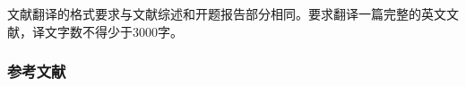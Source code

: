 \part{} %
\label{prt:文献翻译_}
	\setcounter{section}{0}
	文献翻译的格式要求与文献综述和开题报告部分相同。要求翻译一篇完整的英文文献，译文字数不得少于3000字。

	\newpage
	\section*{参考文献} %
	\label{sec:参考文献3}
		\begingroup
		    \setlength{\bibsep}{0pt}
		\endgroup
